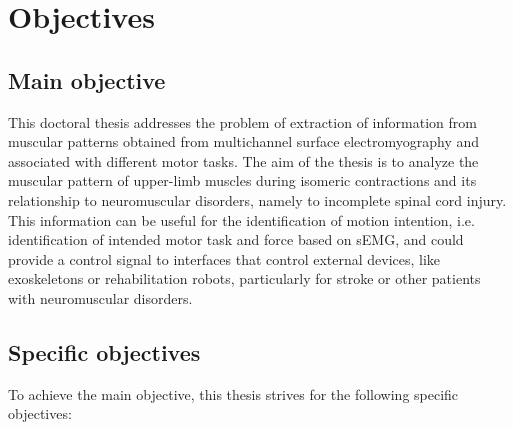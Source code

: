      \section{Objectives}
     
     	\subsection*{Main objective}

This doctoral thesis addresses the problem of extraction of information from muscular patterns obtained from multichannel surface electromyography and associated with different motor tasks. The aim of the thesis is to analyze the muscular pattern of upper-limb muscles during isomeric contractions and its relationship to neuromuscular disorders, namely to incomplete spinal cord injury. This information can be useful for the identification of motion intention, i.e. identification of intended motor task and force based on sEMG, and could provide a control signal to interfaces that control external devices, like exoskeletons or rehabilitation robots, particularly for stroke or other patients with neuromuscular disorders.




        
        \subsection*{Specific objectives}
        
To achieve the main objective, this thesis strives for the following specific objectives:

